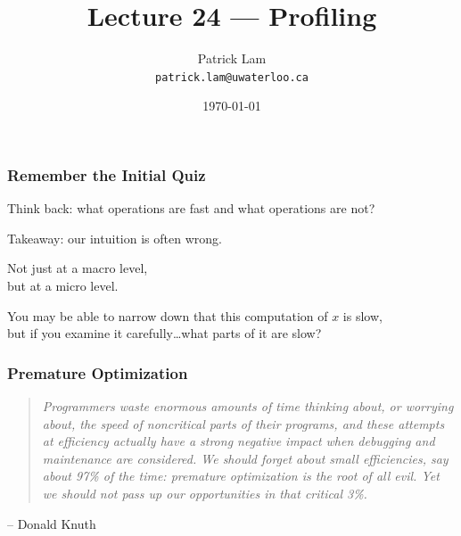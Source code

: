 

\title{Lecture 24 --- Profiling }

\author{Patrick Lam \\ \small \texttt{patrick.lam@uwaterloo.ca}}
\date{\today}




\begin{frame}
  \titlepage

 \end{frame}


\begin{frame}
\frametitle{Remember the Initial Quiz}


Think back: what operations are fast and what operations are not?

Takeaway: our intuition  is often wrong. 

Not just at a macro level, \\
but at a micro level. 

You may be able to narrow down that this computation of $x$ is slow, \\
but if you examine it carefully\ldots what parts of it are slow?


\end{frame}



\begin{frame}
\frametitle{Premature Optimization}

\vspace*{.5cm}

\begin{quote}
\textit{Programmers waste enormous amounts of time thinking about, or worrying about, the speed of noncritical parts of their programs, and these attempts at efficiency actually have a strong negative impact when debugging and maintenance are considered. We should forget about small efficiencies, say about 97\% of the time: premature optimization is the root of all evil. Yet we should not pass up our opportunities in that critical 3\%.}
\end{quote}
	\hfill -- Donald Knuth


\end{frame}



